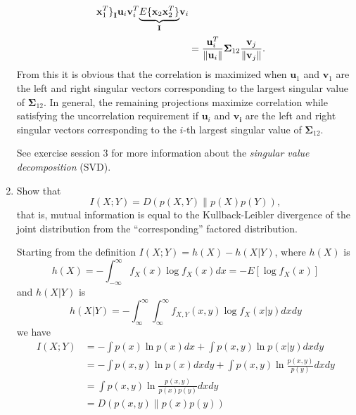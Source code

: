 \begin{enumerate}
\begin{solution}
\begin{align*}
{{{{              \mathbf{x}_1^T\}}_{\mathbf{I}}} \mathbf{u}_i
          \mathbf{v}_i^T \smash{\underbrace{E\{\mathbf{x}_2
              \mathbf{x}_2^T\}}_{\mathbf{I}}} \mathbf{v}_i } }
      \\
      \\
      &= \frac{ \mathbf{u}_i^T} {\|\mathbf{u}_i\|}
      \mathbf{\Sigma}_{12} \frac{ \mathbf{v}_j } { \|\mathbf{v}_j\|}.
    \end{align*}
    From this it is obvious that the correlation is maximized when
    $\mathbf{u}_1$ and $\mathbf{v}_1$ are the left and right singular
    vectors corresponding to the largest singular value of
    $\mathbf{\Sigma}_{12}$.  In general, the remaining projections
    maximize correlation while satisfying the uncorrelation
    requirement if $\mathbf{u}_i$ and $\mathbf{v_i}$ are the left and
    right singular vectors corresponding to the $i$-th largest
    singular value of $\mathbf{\Sigma}_{12}$.

    See exercise session 3 for more information about the
    \emph{singular value decomposition} (SVD).
  \end{solution}
  
\item Show that
  \begin{displaymath}
    I(X;Y) = D\left( p(X,Y) \| p(X)p(Y) \right) ,
  \end{displaymath}
  that is, mutual information is equal to the Kullback-Leibler
  divergence of the joint distribution from the ``corresponding''
  factored distribution.

  \begin{solution}

    Starting from the definition $I(X; Y) = h(X) - h(X | Y)$, where $h(X)$
    is
    \[
    h(X) = -\int_{-\infty}^{\infty} f_X(x) \log f_X(x)dx = -E[\log f_X(x)]
    \] 
    and $h(X|Y)$ is
    \[
    h(X|Y)=-\int_{\infty}^{\infty}\int_{\infty}^{\infty}f_{X,Y}(x,y)\log
    f_X(x|y) dx dy
    \]
    we have
    \begin{equation}
      \begin{split}
        I(X; Y) &= -\int p(x) \ln p(x) dx + \int p(x, y) \ln p(x | y) dx dy\\ 
        &= -\int p(x, y) \ln p(x) dx dy + \int p(x, y) \ln \frac{p(x, y)}{p(y)} dx dy\\ 
        &= \int p(x, y) \ln \frac{p(x, y)}{p(x) p(y)} dx dy \\
        &= D\left(p(x, y) \| p(x)p(y)\right)
      \end{split}
    \end{equation}



\end{solution}
\end{enumerate}
